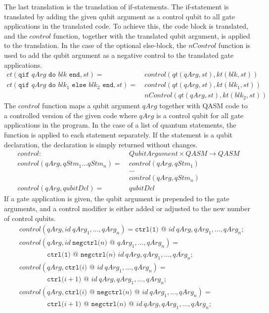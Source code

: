 The last translation is the translation of if-statements. The if-statement is translated by adding the given qubit argument as a control qubit to all gate applications in the translated code. To achieve this, the code block is translated, and the $control$ function, together with the translated qubit argument, is applied to the translation. In the case of the optional else-block, the $nControl$ function is used to add the qubit argument as a negative control to the translated gate applications.
\begin{align*}
        ct(\texttt{qif } qArg \texttt{ do } blk \texttt{ end}, st) = \ 
            &  control(qt(qArg, st), kt(blk, st)) \\
        ct(\texttt{qif } qArg \texttt{ do } blk_1 \texttt{ else } blk_2 \texttt{ end}, st) = \ 
            &  control(qt(qArg, st), kt(blk_1, st)) \\
            &  nControl(qt(qArg, st), kt(blk_2, st))
\end{align*}
The $control$ function maps a qubit argument $qArg$ together with QASM code to a controlled version of the given code where $qArg$ is a control qubit for all gate applications in the program. In the case of a list of quantum statements, the function is applied to each statement separately. If the statement is a qubit declaration, the declaration is simply returned without changes.
\begin{align*}
    control : \ & QubitArgument \times QASM \to QASM\\
    control(qArg, qStm_1 \dots qStm_n) = \ & control(qArg, qStm_1)\\
        & ...\\
        & control(qArg, qStm_n)\\
    control(qArg, qubitDcl) = \ & qubitDcl
\end{align*}
If a gate application is given, the qubit argument is prepended to the gate arguments, and a control modifier is either added or adjusted to the new number of control qubits.
\begin{align*}
    &control(qArg, id \ qArg_1, \dots, qArg_n ) =  \texttt{ctrl(1) @ } id \ qArg, qArg_1, \dots, qArg_n\texttt{;}\\
    &control(qArg, id \ \texttt{negctrl(}n\texttt{) @ } qArg_1, \dots, qArg_n ) = \\
    & \quad \quad \quad \quad \texttt{ctrl(1) @ } \texttt{negctrl(}n\texttt{) }id \ qArg, qArg_1, \dots, qArg_n\texttt{;}\\
    &control(qArg, \texttt{ctrl(}i \texttt{) @ } id \ qArg_1, \dots, qArg_n ) = \\
    & \quad \quad \quad \quad \texttt{ctrl(}i+1 \texttt{) @ } id \ qArg, qArg_1, \dots, qArg_n\texttt{;}\\
    &control(qArg, \texttt{ctrl(}i \texttt{) @ } \texttt{negctrl(}n\texttt{) @ } id \ qArg_1, \dots, qArg_n ) = \\
    & \quad \quad \quad \quad \texttt{ctrl(}i+1 \texttt{) @ } \texttt{negctrl(}n\texttt{) @ } id \ qArg, qArg_1, \dots, qArg_n\texttt{;}
\end{align*}
